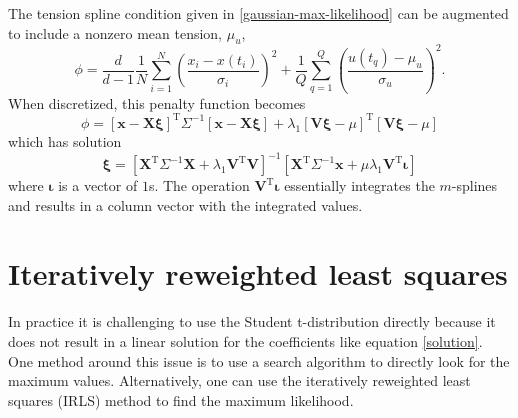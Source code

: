 \documentclass[10pt,journal]{IEEEtran}
\begin{document}
The tension spline condition given in \ref{gaussian-max-likelihood} can be augmented to include a nonzero mean tension, $\mu_u$,
\begin{equation}
\phi =  \frac{d}{d-1} \frac{1}{N} \sum^N _{i=1}\left( \frac{x_i - x(t_i)}{\sigma_i} \right)^2 + \frac{1}{Q} \sum^{Q}_{q=1}  \left(  \frac{u(t_q)-\mu_u}{\sigma_u} \right)^2.
\end{equation}
When discretized, this penalty function becomes
\begin{equation}
\phi = \left[ \mathbf{x} - \mathbf{X} \mathbf{\xi} \right]^{\textrm{T}} \Sigma^{-1} \left[ \mathbf{x} - \mathbf{X} \mathbf{\xi}\right]
+ \lambda_1 \left[\mathbf{V}\mathbf{\xi} - \mu \right]^{\textrm{T}} \left[ \mathbf{V}\mathbf{\xi} - \mu \right]
\end{equation}
which has solution
\begin{equation}
\mathbf{\xi} = \left[ \mathbf{X}^{\textrm{T}} \Sigma^{-1} \mathbf{X} + \lambda_1 \mathbf{V}^{\textrm{T}} \mathbf{V} \right]^{-1}   \left[ \mathbf{X}^{\textrm{T}} \Sigma^{-1} \mathbf{x} +  \mu \lambda_1 \mathbf{V}^{\textrm{T}} \mathbf{\iota} \right]
\end{equation}
where $\mathbf{\iota}$ is a vector of $1$s. The operation $\mathbf{V}^{\textrm{T}} \mathbf{\iota}$ essentially integrates the $m$-splines and results in a column vector with the integrated values.

\section{Iteratively reweighted least squares}
\label{sec:irls}

In practice it is challenging to use the Student t-distribution directly because it does not result in a linear solution for the coefficients like equation \ref{solution}. One method around this issue is to use a search algorithm to directly look for the maximum values. Alternatively, one can use the iteratively reweighted least squares (IRLS) method to find the maximum likelihood.
\end{document}
